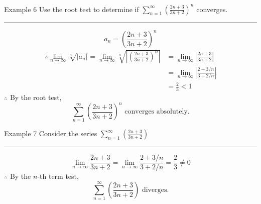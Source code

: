 \documentclass[12pt,a4paper]{article}
\begin{document}
\begin{eg}{Example 6}
	Use the root test to determine if $\displaystyle\sum_{n=1}^\infty\left(\frac{2n+3}{3n+2}\right)^n$ converges. 	\\
	\noindent\rule[0.25\baselineskip]{\textwidth}{1pt}
	$$a_n=\left(\frac{2n+3}{3n+2}\right)^n$$
	$$\begin{aligned}
		\therefore\lim_{n\to\infty}\sqrt[n]{|a_n|}=\lim_{n\to\infty}\sqrt[n]{\left|\left(\frac{2n+3}{3n+2}\right)^n\right|}&=\lim_{n\to\infty}\left|\frac{2n+3}{3n+2}\right|\\
		&=\lim_{n\to\infty}\left|\frac{2+3/n}{3+2/n}\right|\\
		&=\frac{2}{3}<1
	\end{aligned}$$
	$\therefore$ By the root test,
	$$\sum_{n=1}^\infty\left(\frac{2n+3}{3n+2}\right)^n\text{ converges absolutely.}$$
\end{eg}
\begin{eg}{Example 7}
	Consider the series $\displaystyle\sum_{n=1}^\infty\left(\frac{2n+3}{3n+2}\right)$\\
	\noindent\rule[0.25\baselineskip]{\textwidth}{1pt}
	$$\lim_{n\to\infty}\frac{2n+3}{3n+2}=\lim_{n\to\infty}\frac{2+3/n}{3+2/n}=\frac{2}{3}\neq0$$
	$\therefore$ By the $n$-th term test,
	$$\sum_{n=1}^\infty\left(\frac{2n+3}{3n+2}\right)\text{ diverges}.$$
\end{eg}
\end{document}

